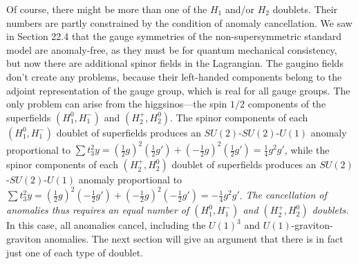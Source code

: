 Of course, there might be more than one of the \(H_1\) and/or \(H_2\)
doublets. Their numbers are partly constrained by the condition of
anomaly cancellation. We saw in Section 22.4 that the gauge symmetries
of the non-supersymmetric standard model are anomaly-free, as they must
be for quantum mechanical consistency, but now there are additional
spinor fields in the Lagrangian. The gaugino fields don't create any
problems, because their left-handed components belong to the adjoint
representation of the gauge group, which is real for all gauge groups.
The only problem can arise from the higgsinos---the spin \(1/2\)
components of the superfields \((H_1^0,H_1^-)\) and
\((H_2^+,H_2^0)\). The spinor components of each
\((H_1^0,H_1^-)\) doublet of superfields produces an
\(SU(2)\)-\(SU(2)\)-\(U(1)\) anomaly proportional to
\(\sum t_3^2y=(\frac12g)^2(\frac12g')
 +(-\frac12g)^2(\frac12g')=\frac14g^2g'\), while the spinor
components of each \((H_2^+,H_2^0)\) doublet of superfields produces an
\(SU(2)\)-\(SU(2)\)-\(U(1)\) anomaly proportional to
\(\sum t_3^2y=(\frac12g)^2(-\frac12g')
 +(-\frac12g)^2(-\frac12g')=-\frac14g^2g'\).
\textit{The cancellation of anomalies thus requires an equal number of
\((H_1^0,H_1^-)\) and \((H_2^+,H_2^0)\) doublets.} In this case, all
anomalies cancel, including the \(U(1)^3\) and
\(U(1)\)-graviton-graviton anomalies. The next section will give an
argument that there is in fact just one of each type of doublet.

